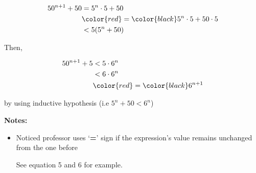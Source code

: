 \documentclass[12pt]{article}
\begin{document}
\begin{itemize}
\begin{mdframed}
        \begin{align}
            50^{n+1} + 50 &= 5^n \cdot 5 + 50\\
            &\color{red}=\color{black} 5^n \cdot 5 + 50 \cdot 5\\
            &< 5(5^n + 50)
        \end{align}

        \bigskip

        Then,

        \begin{align}
            50^{n+1} + 5 &< 5 \cdot 6^n\\
            &< 6 \cdot 6^n\\
            &\color{red}=\color{black} 6^{n+1}
        \end{align}

        by using inductive hypothesis (i.e $5^n + 50 < 6^n$)
    \end{mdframed}

    \bigskip

    \textbf{Notes:}

    \begin{itemize}
        \item Noticed professor uses `\textbf{=}' sign if the expression's value
        remains unchanged from the one before

        \bigskip

        See equation 5 and 6 for example.
    \end{itemize}

\end{itemize}
\end{document}
